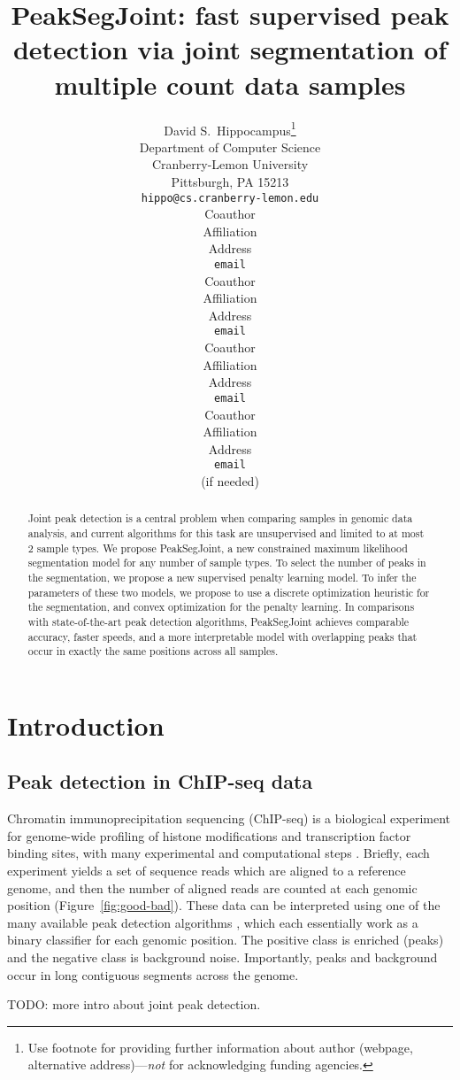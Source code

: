 \documentclass{article} %
\title{PeakSegJoint: fast supervised peak detection via joint
  segmentation of multiple count data samples}
\author{
David S.~Hippocampus\thanks{ Use footnote for providing further information
about author (webpage, alternative address)---\emph{not} for acknowledging
funding agencies.} \\
Department of Computer Science\\
Cranberry-Lemon University\\
Pittsburgh, PA 15213 \\
\texttt{hippo@cs.cranberry-lemon.edu} \\
\And
Coauthor \\
Affiliation \\
Address \\
\texttt{email} \\
\AND
Coauthor \\
Affiliation \\
Address \\
\texttt{email} \\
\And
Coauthor \\
Affiliation \\
Address \\
\texttt{email} \\
\And
Coauthor \\
Affiliation \\
Address \\
\texttt{email} \\
(if needed)\\
}
\begin{document}
\maketitle

\begin{abstract}
  Joint peak detection is a central problem when comparing samples in
  genomic data analysis, and current algorithms for this task are
  unsupervised and limited to at most 2 sample types. We propose
  PeakSegJoint, a new constrained maximum likelihood segmentation
  model for any number of sample types. To select the number of peaks
  in the segmentation, we propose a new supervised penalty learning
  model. To infer the parameters of these two models, we propose to
  use a discrete optimization heuristic for the segmentation, and
  convex optimization for the penalty learning. In comparisons with
  state-of-the-art peak detection algorithms, PeakSegJoint achieves
  comparable accuracy, faster speeds, and a more interpretable model
  with overlapping peaks that occur in exactly the same positions
  across all samples.
\end{abstract}

\section{Introduction}

\subsection{Peak detection in ChIP-seq data}

Chromatin immunoprecipitation sequencing (ChIP-seq) is a biological
experiment for genome-wide profiling of histone modifications and
transcription factor binding sites, with many experimental and
computational steps \citep{practical}. Briefly, each experiment yields
a set of sequence reads which are aligned to a reference genome, and
then the number of aligned reads are counted at each genomic position
(Figure~\ref{fig:good-bad}). These data can be interpreted using
one of the many available peak detection algorithms
\citep{evaluation2010, rye2010manually, chip-seq-bench}, which each
essentially work as a binary classifier for each genomic position. The
positive class is enriched (peaks) and the negative class is
background noise. Importantly, peaks and background occur in long
contiguous segments across the genome.

TODO: more intro about joint peak detection.
\end{document}
